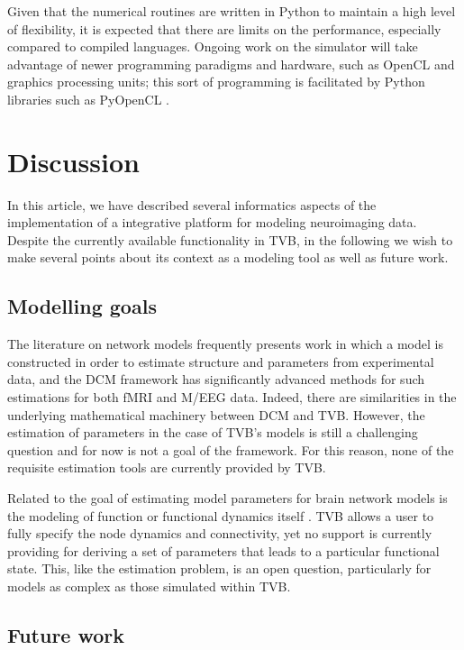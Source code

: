 \documentclass{bioinfo}
\begin{document}
Given that the numerical routines are written in Python to maintain a high level
of flexibility, it is expected that there are limits on the performance, especially 
compared to compiled languages. Ongoing work on the simulator will take advantage of
newer programming paradigms and hardware, such as OpenCL and graphics processing units; 
this sort of programming is facilitated by Python libraries such as PyOpenCL
\citep{klockner2012pycuda}.

\section{Discussion}

In this article, we have described several informatics aspects of the
implementation of a integrative platform for modeling neuroimaging data.
Despite the currently available functionality in TVB, in the following we wish
to make several points about its context as a modeling tool as well as 
future work. 

\subsection{Modelling goals}

The literature on network models frequently presents work in which a model
is constructed in order to estimate structure and parameters from 
experimental data, and the DCM framework has significantly advanced 
methods for such estimations for both fMRI and M/EEG data. Indeed, there
are similarities in the underlying mathematical machinery between DCM and 
TVB. However, the estimation of parameters in the case of TVB's models
is still a challenging question and for now is not a goal of the framework. 
For this reason, none of the requisite estimation tools are currently 
provided by TVB.

Related to the goal of estimating model parameters for brain network models
is the modeling of function or functional dynamics itself 
\citep{erlhagen2002dynamic, eliasmith2012large}. TVB allows a user
to fully specify the node dynamics and connectivity, yet no support
is currently providing for deriving a set of parameters that leads to 
a particular functional state. This, like the estimation problem, is 
an open question, particularly for models as complex as those simulated 
within TVB.

\subsection{Future work}
\end{document}
